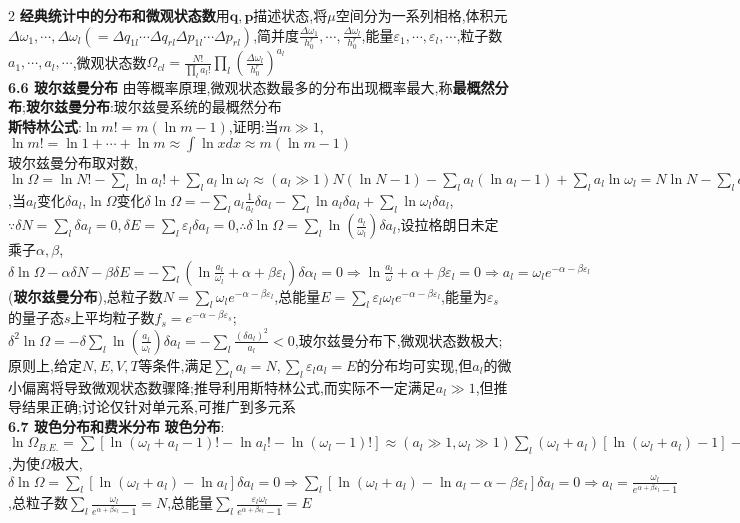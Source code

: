 \documentclass[10pt,a4paper]{article}
\begin{document}
\begin{multicols}{2}
\textbf{经典统计中的分布和微观状态数}用$\bm{q},\bm{p}$描述状态,将$\mu$空间分为一系列相格,体积元$\Delta\omega_1,\cdots,\Delta\omega_l(=\Delta q_{1l}\cdots\Delta q_{rl}\Delta p_{1l}\cdots\Delta p_{rl})$,简并度$\frac{\Delta\omega_1}{h_0^r},\cdots,\frac{\Delta\omega_l}{h_0^r}$,能量$\varepsilon_1,\cdots,\varepsilon_l,\cdots$,粒子数$a_1,\cdots,a_l,\cdots$,微观状态数$\Omega_{cl}=\frac{N!}{\prod_la_l!}\prod_l\left(\frac{\Delta\omega_l}{h_0^r}\right)^{a_l}$\\
\textbf{6.6 玻尔兹曼分布}
由等概率原理,微观状态数最多的分布出现概率最大,称\textbf{最概然分布};\textbf{玻尔兹曼分布}:玻尔兹曼系统的最概然分布\\
\textbf{斯特林公式}:$\ln m!=m(\ln m-1)$,证明:当$m\gg1$,$\ln m!=\ln1+\cdots+\ln m\approx\int\ln xdx\approx m(\ln m-1)$\\
玻尔兹曼分布取对数,$\ln\Omega=\ln N!-\sum_l\ln a_l!+\sum_l a_l\ln\omega_l\approx(a_l\gg1)N(\ln N-1)-\sum_l a_l(\ln a_l-1)+\sum_l a_l\ln\omega_l=N\ln N-\sum_la_l\ln a_l+\sum_la_l\ln\omega_l$,当$a_l$变化$\delta a_l$,$\ln\Omega$变化$\delta\ln\Omega=-\sum_la_l\frac{1}{a_l}\delta a_l-\sum_l\ln a_l\delta a_l+\sum_l\ln\omega_l\delta a_l$,$\because\delta N=\sum_l\delta a_l=0,\delta E=\sum_l\varepsilon_l\delta a_l=0$,$\therefore\delta\ln\Omega=\sum_l\ln\left(\frac{a_l}{\omega_l}\right)\delta a_l$,设拉格朗日未定乘子$\alpha,\beta$,$\delta\ln\Omega-\alpha\delta N-\beta\delta E=-\sum_l\left(\ln\frac{a_l}{\omega_l}+\alpha+\beta\varepsilon_l\right)\delta\alpha_l=0\Rightarrow\ln\frac{a_l}{\omega}+\alpha+\beta\varepsilon_l=0\Rightarrow a_l=\omega_le^{-\alpha-\beta\varepsilon_l}$(\textbf{玻尔兹曼分布}),总粒子数$N=\sum_l\omega_le^{-\alpha-\beta\varepsilon_l}$,总能量$E=\sum_l\varepsilon_l\omega_le^{-\alpha-\beta\varepsilon_l}$,能量为$\varepsilon_s$的量子态$s$上平均粒子数$f_s=e^{-\alpha-\beta\varepsilon_s}$;$\delta^2\ln\Omega=-\delta\sum_l\ln\left(\frac{a_l}{\omega_l}\right)\delta a_l=-\sum_l\frac{(\delta a_l)^2}{a_l}<0$,玻尔兹曼分布下,微观状态数极大;原则上,给定$N,E,V,T$等条件,满足$\sum_la_l=N,\sum_l\varepsilon_la_l=E$的分布均可实现,但$a_l$的微小偏离将导致微观状态数骤降;推导利用斯特林公式,而实际不一定满足$a_l\gg1$,但推导结果正确;讨论仅针对单元系,可推广到多元系\\
\textbf{6.7 玻色分布和费米分布}
\textbf{玻色分布}:$\ln\Omega_{B.E.}=\sum[\ln(\omega_l+a_l-1)!-\ln a_l!-\ln(\omega_l-1)!]\approx(a_l\gg1,\omega_l\gg1)\sum_l(\omega_l+a_l)[\ln(\omega_l+a_l)-1]-a_l[\ln a_l-1]-\omega_l[\ln\omega_l-1]\approx\sum_l(\omega_l+a_l)\ln(\omega_l+a_l)-a_l\ln a_l-\omega_l\ln\omega_l$,为使$\Omega$极大,$\delta\ln\Omega=\sum_l[\ln(\omega_l+a_l)-\ln a_l]\delta a_l=0\Rightarrow\sum_l[\ln(\omega_l+a_l)-\ln a_l-\alpha-\beta\varepsilon_l]\delta a_l=0\Rightarrow a_l=\frac{\omega_l}{e^{\alpha+\beta\varepsilon_l}-1}$,总粒子数$\sum_l\frac{\omega_l}{e^{\alpha+\beta\varepsilon_l}-1}=N$,总能量$\sum_l\frac{\varepsilon_l\omega_l}{e^{\alpha+\beta\varepsilon_l}-1}=E$\\

\end{multicols}
\end{document}
